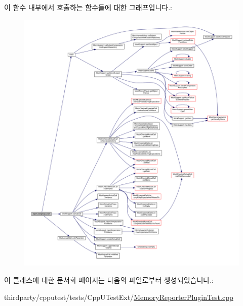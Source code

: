 이 함수 내부에서 호출하는 함수들에 대한 그래프입니다.\+:
\nopagebreak
\begin{figure}[H]
\begin{center}
\leavevmode
\includegraphics[width=350pt]{class_mock_memory_report_formatter_a92e1ff68cbfdf8da417eb8ae4fee6288_cgraph}
\end{center}
\end{figure}




이 클래스에 대한 문서화 페이지는 다음의 파일로부터 생성되었습니다.\+:\begin{DoxyCompactItemize}
\item 
thirdparty/cpputest/tests/\+Cpp\+U\+Test\+Ext/\hyperlink{_memory_reporter_plugin_test_8cpp}{Memory\+Reporter\+Plugin\+Test.\+cpp}\end{DoxyCompactItemize}
